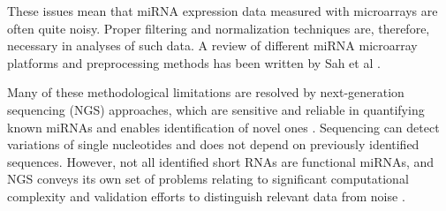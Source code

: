 
These issues mean that miRNA expression data measured with microarrays are often
quite noisy. Proper filtering and normalization techniques are, therefore,
necessary in analyses of such data. A review of different miRNA microarray
platforms and preprocessing methods has been written by Sah et al \citep{Sah2010}.

Many of these methodological limitations are resolved by next-generation
sequencing (NGS) approaches, which are sensitive and
reliable in quantifying known miRNAs and enables identification of novel ones
\citep{Huang2011}. Sequencing can detect variations of single nucleotides and
does not depend on previously identified sequences. However, not
all identified short RNAs are functional miRNAs, and NGS conveys its own set
of problems relating to significant computational complexity and
validation efforts to distinguish relevant data from noise
\citep{Hunt2015}.
